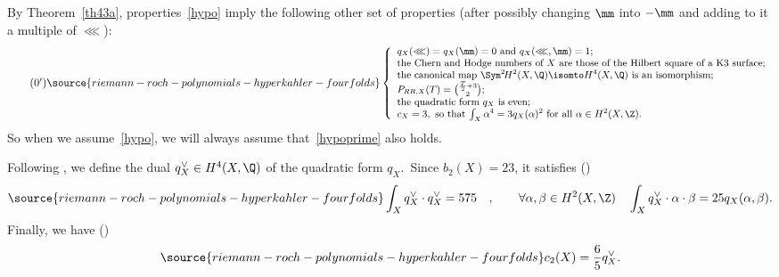 By Theorem~\ref{th43a}, properties~\eqref{hypo} imply the following other set of properties (after possibly changing $\mm$ into $-\mm$ and adding to it a multiple of $\lll$):
\begin{equation}\tag{\theequation$^\prime$}\label{hypoprime}
\source{riemann-roch-polynomials-hyperkahler-fourfolds}
\begin{small}    \left\{
    \begin{array}{l}
   q_X(\lll)=q_X(\mm)=0\hbox{ and } q_X(\lll,\mm)=1; \\
   \hbox{the Chern and Hodge numbers of $X$ are those of the Hilbert square of a K3 surface;}\\
    \hbox{the canonical map $\Sym^2\!H^2(X,\Q)\isomto H^4(X,\Q)$ is an isomorphism;}\\
    P_{RR,X}(T)= \binom{ \frac{T}{2}+3}{2};\\
    \hbox{the quadratic form $q_X$ is even};\\
c_X =3, \hbox{ so that $\int_X\alpha^4=3q_X(\alpha)^2$ for all } \alpha\in H^2(X,\Z).
    \end{array}
    \right.
\end{small}
\end{equation}
So when we assume~\eqref{hypo}, we will always assume that~\eqref{hypoprime} also holds.


Following \cite[Section~3]{og1}, we define the dual $q_X^\vee \in H^4(X,\Q)$ of the quadratic form $q_X$.\
Since $b_2(X)=23$, it satisfies (\cite[Proposition~2.2]{og1})
\begin{equation}\label{qxc}
\source{riemann-roch-polynomials-hyperkahler-fourfolds}
\int_X q_X^\vee\cdot q_X^\vee=575\quad,\qquad \forall \alpha,\beta\in H^2(X,\Z)\quad \int_X q_X^\vee\cdot\alpha\cdot\beta=25 q_X(\alpha,\beta).
\end{equation}
Finally, we have (\cite[(3.0.45)]{og1})
\begin{equation}\label{c2}
\source{riemann-roch-polynomials-hyperkahler-fourfolds}
c_2(X)=\frac 65 q_X^\vee.
\end{equation}

